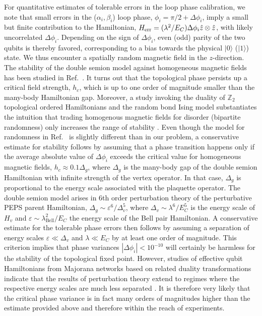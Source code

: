 \documentclass[twocolumn,floats,prx,showpacs]{revtex4-1}
\newcommand{\ket}[1]{|#1\rangle}
\newcommand{\rein}[1]{{\color{rein} #1}}
\begin{document}
\rein{
For quantitative estimates of tolerable errors in the loop phase calibration, we note that small errors in the ($\alpha_i,\beta_i$) loop phase,
$\phi_i=\pi/2 +\Delta \phi_i$, 
imply a small but finite contribution to the Hamiltonian, $H_{\rm err}=(\lambda^2/E_C) \Delta \phi_i \hat z \otimes \hat z$, with likely uncorrelated $\Delta \phi_i$. Depending on the sign of $\Delta \phi_i$, even (odd) parity of the two qubits is thereby favored, corresponding to a bias towards the physical $\ket{0}$ ($\ket{1}$) state. We thus encounter a spatially random magnetic field in the $z$-direction. The stability of the double semion model against homogeneous magnetic fields has been studied  in Ref.~\cite{Morampudi14}. It turns out that the topological phase persists up a critical field strength, $h_c$, which is up to one order of magnitude smaller than the many-body Hamiltonian gap. Moreover, a study invoking the duality of $\mathbb Z_2$ topological ordered Hamiltonians and the random bond Ising model substantiates the intuition that trading homogenous magnetic fields for disorder (bipartite randomness) only increases the range of stability \cite{Tsomokos2011}. 
Even though the model for randomness in Ref.~\cite{Tsomokos2011} is slightly different than in our problem, a conservative estimate for stability follows by assuming that a phase transition happens only if the average absolute value of $\Delta \phi_i$ exceeds the critical value for homogeneous magnetic fields, $h_c \approx 0.1 \Delta_g$, where $\Delta_g$ is the many-body gap  of the double semion Hamiltonian with infinite strength of the vertex operator. In that case, $\Delta_g$ is proportional to the energy scale associated with the plaquette operator. The double semion model arises 
in 6th order perturbation theory of the perturbative PEPS parent Hamiltonian,  $\Delta_g\sim\varepsilon^6/\Delta_v^5$, where $\Delta_v \sim \lambda^6/E_C^5$ is the energy scale of $H_v$ and $\varepsilon \sim \lambda_\text{Bell}^2/E_C$ the energy scale of the Bell pair Hamiltonian. A conservative estimate for the tolerable phase errors then follows by assuming a separation of 
energy scales $\varepsilon \ll \Delta_v$ and $\lambda \ll E_C$ by at least one order of magnitude.  This criterion implies that phase variances $|\Delta\phi_i|<10^{-10}$ 
will certainly be harmless for the stability of the topological fixed point.  However, studies of effective qubit Hamiltonians from Majorana networks based on related duality transformations indicate that the results of perturbation theory 
extend to regimes where the respective energy scales are much less separated \cite{PhysRevLett.108.260504}. It is therefore very likely that the critical phase variance is in fact many orders of magnitudes higher than the estimate provided above and therefore within the reach of experiments.  }
\end{document}
